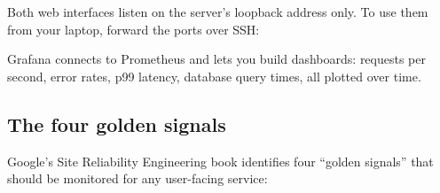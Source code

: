 \begin{codebox}[short]

\begin{Shaded}
\begin{Highlighting}[]
\KeywordTok{:}
\AttributeTok{  }\KeywordTok{:}

\KeywordTok{:}
\AttributeTok{  }\KeywordTok{{-}}\AttributeTok{ }\KeywordTok{:}\AttributeTok{ }
\AttributeTok{    }\KeywordTok{:}
\AttributeTok{      }\KeywordTok{{-}}\AttributeTok{ }\KeywordTok{:}\AttributeTok{ }\KeywordTok{[}\KeywordTok{]}
\end{Highlighting}
\end{Shaded}

\end{codebox}

\noindent{}Both web interfaces listen on the server's loopback address only. To use them from your laptop, forward the ports over SSH:

\begin{codebox}[short]

\begin{Shaded}
\begin{Highlighting}[]
 
\end{Highlighting}
\end{Shaded}

\end{codebox}

\noindent{}Grafana connects to Prometheus and lets you build dashboards: requests per second, error rates, p99 latency, database query times, all plotted over time.

\subsection*{The four golden signals}\label{35-observability:the-four-golden-signals}

Google's Site Reliability Engineering book identifies four ``golden signals'' that should be monitored for any user-facing service:

